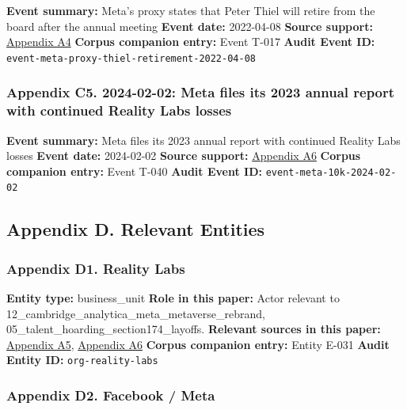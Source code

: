 \documentclass[
  american,
  11pt,
  letterpaper,
]{article}
\begin{document}
\textbf{Event summary:} Meta's proxy states that Peter Thiel will retire
from the board after the annual meeting \textbf{Event date:} 2022-04-08
\textbf{Source support:}
\hyperref[ch-01-appendix-a4-meta-platforms-inc-2022-definitive-proxy-statement]{Appendix
A4} \textbf{Corpus companion entry:} Event T-017 \textbf{Audit Event
ID:} \texttt{event-meta-proxy-thiel-retirement-2022-04-08}

\subsubsection{Appendix C5. 2024-02-02: Meta files its 2023 annual
report with continued Reality Labs
losses}\label{ch-01-appendix-c5-2024-02-02-meta-files-its-2023-annual-report-with-continued-reality-labs-losses}

\textbf{Event summary:} Meta files its 2023 annual report with continued
Reality Labs losses \textbf{Event date:} 2024-02-02 \textbf{Source
support:}
\hyperref[ch-01-appendix-a6-meta-platforms-inc-2023-annual-report-form-10-k]{Appendix
A6} \textbf{Corpus companion entry:} Event T-040 \textbf{Audit Event
ID:} \texttt{event-meta-10k-2024-02-02}

\subsection{Appendix D. Relevant
Entities}\label{appendix-d.-relevant-entities-1}

\subsubsection{Appendix D1. Reality
Labs}\label{ch-01-appendix-d1-reality-labs}

\textbf{Entity type:} business\_unit \textbf{Role in this paper:} Actor
relevant to 12\_cambridge\_analytica\_meta\_metaverse\_rebrand,
05\_talent\_hoarding\_section174\_layoffs. \textbf{Relevant sources in
this paper:}
\hyperref[ch-01-appendix-a5-the-facebook-company-is-now-meta]{Appendix
A5},
\hyperref[ch-01-appendix-a6-meta-platforms-inc-2023-annual-report-form-10-k]{Appendix
A6} \textbf{Corpus companion entry:} Entity E-031 \textbf{Audit Entity
ID:} \texttt{org-reality-labs}

\subsubsection{Appendix D2. Facebook /
Meta}\label{ch-01-appendix-d2-facebook-meta}
\end{document}
